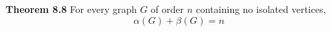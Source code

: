 \nopagenumbers
{\bf Theorem 8.8}
\vskip 6pt
For every graph $G$ of order $n$ containing no isolated vertices, $$ \alpha (G)+ \beta (G)=n$$

\vfill\eject
